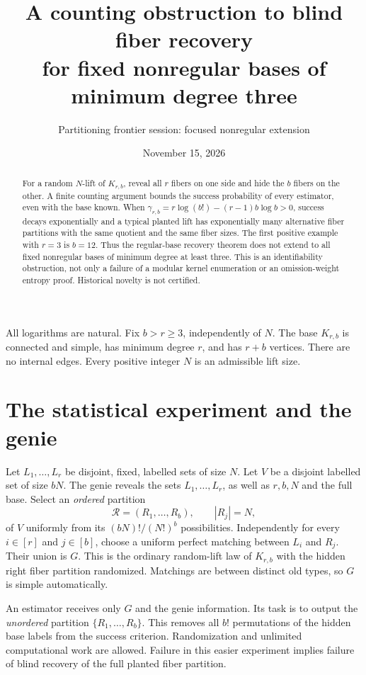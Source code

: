 \documentclass[11pt]{article}
\title{A counting obstruction to blind fiber recovery\protect\\
for fixed nonregular bases of minimum degree three}
\author{Partitioning frontier session: focused nonregular extension}
\date{November 15, 2026}
\begin{document}
\maketitle

\begin{abstract}
For a random $N$-lift of $K_{r,b}$, reveal all $r$ fibers on one side
and hide the $b$ fibers on the other. A finite counting argument bounds
the success probability of every estimator, even with the base known.
When $\gamma_{r,b}=r\log(b!)-(r-1)b\log b>0$, success decays
exponentially and a typical planted lift has exponentially many
alternative fiber partitions with the same quotient and the same
fiber sizes. The first positive example with $r=3$ is $b=12$.
Thus the regular-base recovery theorem does not extend to all fixed
nonregular bases of minimum degree at least three. This is an
identifiability obstruction, not only a failure of a modular kernel
enumeration or an omission-weight entropy proof. Historical novelty
is not certified.
\end{abstract}

All logarithms are natural. Fix $b>r\ge3$, independently of $N$.
The base $K_{r,b}$ is connected and simple, has minimum degree $r$,
and has $r+b$ vertices. There are no internal edges. Every positive
integer $N$ is an admissible lift size.

\section{The statistical experiment and the genie}
Let $L_1,\ldots,L_r$ be disjoint, fixed, labelled sets of size $N$.
Let $V$ be a disjoint labelled set of size $bN$. The genie reveals
the sets $L_1,\ldots,L_r$, as well as $r,b,N$ and the full base.
Select an \emph{ordered} partition
\[
 \mathcal R=(R_1,\ldots,R_b),\qquad |R_j|=N,
\]
of $V$ uniformly from its $(bN)!/(N!)^b$ possibilities.
Independently for every $i\in[r]$ and $j\in[b]$, choose a uniform
perfect matching between $L_i$ and $R_j$. Their union is $G$.
This is the ordinary random-lift law of $K_{r,b}$ with the hidden
right fiber partition randomized. Matchings are between distinct
old types, so $G$ is simple automatically.

An estimator receives only $G$ and the genie information. Its task
is to output the \emph{unordered} partition $\{R_1,\ldots,R_b\}$.
This removes all $b!$ permutations of the hidden base labels from
the success criterion. Randomization and unlimited computational
work are allowed. Failure in this easier experiment implies failure
of blind recovery of the full planted fiber partition.
\end{document}
